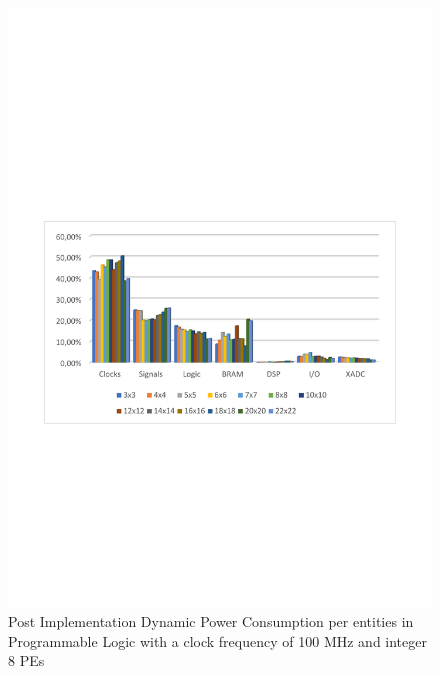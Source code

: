 \begin{figure}[!htbp]
\centering
\captionsetup{justification=centering}
\includegraphics[scale=0.7,angle=0]{./figure/graphs/power_pldyn_div_int8_freq_100mhz.pdf}
\caption{Post Implementation Dynamic Power Consumption per entities in Programmable Logic with a clock frequency of 100 MHz and integer 8 PEs}
\label{fig:dynpowint8ent100}
\end{figure}
